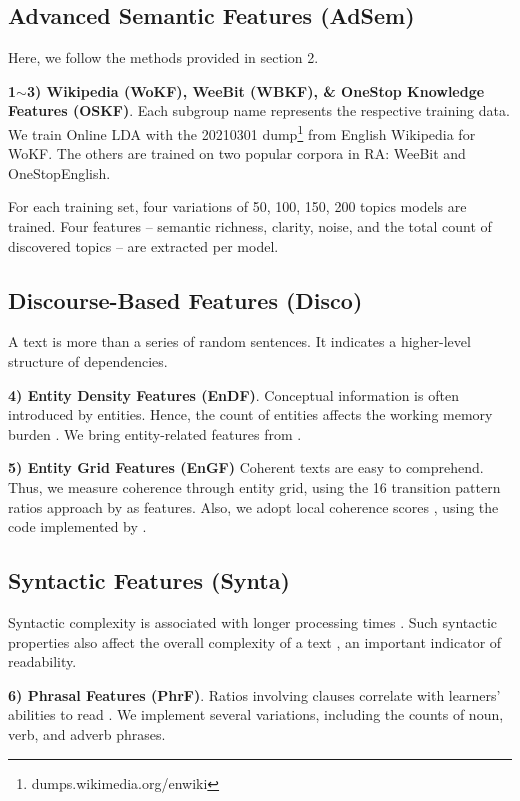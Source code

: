 \documentclass[11pt]{article}
\begin{document}
\subsection{Advanced Semantic Features (AdSem)}
Here, we follow the methods provided in section 2.

\textbf{1$\sim$3) Wikipedia (WoKF), WeeBit (WBKF), \& OneStop Knowledge Features (OSKF)}. 
Each subgroup name represents the respective training data. We train Online LDA \citep{hoffman2010online} with the 20210301 dump\footnote{dumps.wikimedia.org/enwiki} from English Wikipedia for WoKF. The others are trained on two popular corpora in RA: WeeBit and OneStopEnglish. 

For each training set, four variations of 50, 100, 150, 200 topics models are trained. Four features -- semantic richness, clarity, noise, and the total count of discovered topics -- are extracted per model.

\subsection{Discourse-Based Features (Disco)}
A text is more than a series of random sentences. It indicates a higher-level structure of dependencies.

\textbf{4) Entity Density Features (EnDF)}. 
Conceptual information is often introduced by entities. Hence, the count of entities affects the working memory burden \citep{Feng:09}. We bring entity-related features from \citet{Feng:10}.

\textbf{5) Entity Grid Features (EnGF)} 
Coherent texts are easy to comprehend. Thus, we measure coherence through entity grid, using the 16 transition pattern ratios approach by \citet{Pitler:08} as features. Also, we adopt local coherence scores \citep{guinaudeau2013graph}, using the code implemented by \citet{palma2018coherence}. 

\subsection{Syntactic Features (Synta)}
Syntactic complexity is associated with longer processing times \citep{gibson1998linguistic}. Such syntactic properties also affect the overall complexity of a text \citep{hale2016information}, an important indicator of readability.

\textbf{6) Phrasal Features (PhrF)}. 
Ratios involving clauses correlate with learners' abilities to read \citep{lu2010automatic}. We implement several variations, including the counts of noun, verb, and adverb phrases.
\end{document}
